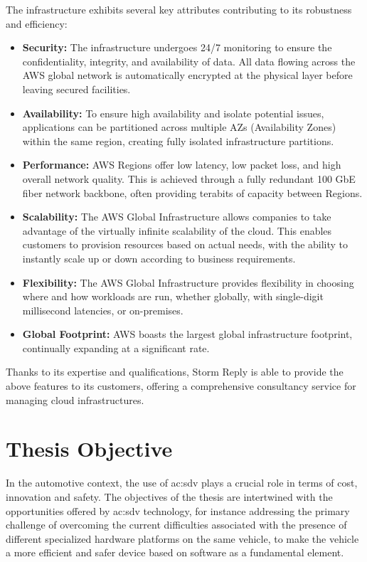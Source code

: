 The infrastructure exhibits several key attributes contributing to its robustness and efficiency: 
\begin{itemize} 
  \item \textbf{Security:} The infrastructure undergoes 24/7 monitoring to ensure the confidentiality, integrity, and availability of data. All data flowing across the AWS global network is automatically encrypted at the physical layer before leaving secured facilities.
  \item \textbf{Availability:} To ensure high availability and isolate potential issues, applications can be partitioned across multiple AZs (Availability Zones) within the same region, creating fully isolated infrastructure partitions.
  \item \textbf{Performance:} AWS Regions offer low latency, low packet loss, and high overall network quality. This is achieved through a fully redundant 100 GbE fiber network backbone, often providing terabits of capacity between Regions.
  \item \textbf{Scalability:} The AWS Global Infrastructure allows companies to take advantage of the virtually infinite scalability of the cloud. This enables customers to provision resources based on actual needs, with the ability to instantly scale up or down according to business requirements.
  \item \textbf{Flexibility:} The AWS Global Infrastructure provides flexibility in choosing where and how workloads are run, whether globally, with single-digit millisecond latencies, or on-premises.
  \item \textbf{Global Footprint:} AWS boasts the largest global infrastructure footprint, continually expanding at a significant rate.
\end{itemize}
Thanks to its expertise and qualifications, Storm Reply is able to provide the above features to its customers, offering a comprehensive consultancy service for managing cloud infrastructures.

\section{Thesis Objective}
In the automotive context, the use of \gls{ac:sdv} plays a crucial role in terms of cost, innovation and safety. The objectives of the thesis are intertwined with the opportunities offered by \gls{ac:sdv} technology, for instance addressing the primary challenge of overcoming the current difficulties associated with the presence of different specialized hardware platforms on the same vehicle, to make the vehicle a more efficient and safer device based on software as a fundamental element.

